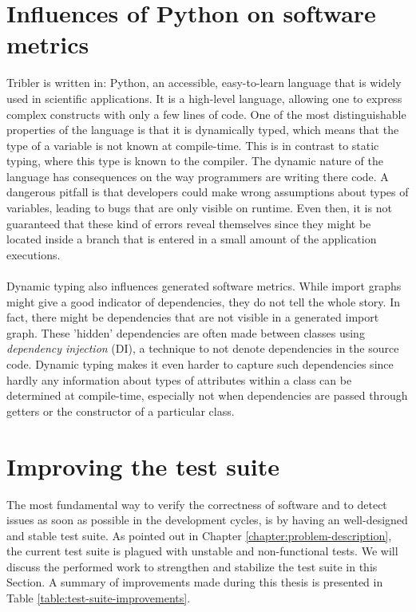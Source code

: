 \section{Influences of Python on software metrics}
Tribler is written in: Python, an accessible, easy-to-learn language that is widely used in scientific applications. It is a high-level language, allowing one to express complex constructs with only a few lines of code. One of the most distinguishable properties of the language is that it is dynamically typed, which means that the type of a variable is not known at compile-time. This is in contrast to static typing, where this type is known to the compiler. The dynamic nature of the language has consequences on the way programmers are writing there code. A dangerous pitfall is that developers could make wrong assumptions about types of variables, leading to bugs that are only visible on runtime. Even then, it is not guaranteed that these kind of errors reveal themselves since they might be located inside a branch that is entered in a small amount of the application executions.\\\\
Dynamic typing also influences generated software metrics. While import graphs might give a good indicator of dependencies, they do not tell the whole story. In fact, there might be dependencies that are not visible in a generated import graph. These 'hidden' dependencies are often made between classes using \emph{dependency injection} (DI), a technique to not denote dependencies in the source code. Dynamic typing makes it even harder to capture such dependencies since hardly any information about types of attributes within a class can be determined at compile-time, especially not when dependencies are passed through getters or the constructor of a particular class.

\section{Improving the test suite}
The most fundamental way to verify the correctness of software and to detect issues as soon as possible in the development cycles, is by having an well-designed and stable test suite. As pointed out in Chapter \ref{chapter:problem-description}, the current test suite is plagued with unstable and non-functional tests. We will discuss the performed work to strengthen and stabilize the test suite in this Section. A summary of improvements made during this thesis is presented in Table \ref{table:test-suite-improvements}.

